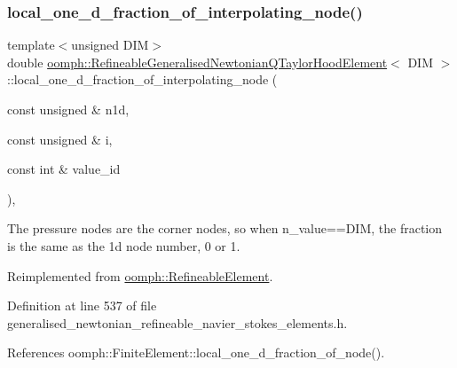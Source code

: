 \subsubsection{\texorpdfstring{local\+\_\+one\+\_\+d\+\_\+fraction\+\_\+of\+\_\+interpolating\+\_\+node()}{local\_one\_d\_fraction\_of\_interpolating\_node()}}
{\footnotesize\ttfamily template$<$unsigned D\+IM$>$ \\
double \hyperlink{classoomph_1_1RefineableGeneralisedNewtonianQTaylorHoodElement}{oomph\+::\+Refineable\+Generalised\+Newtonian\+Q\+Taylor\+Hood\+Element}$<$ D\+IM $>$\+::local\+\_\+one\+\_\+d\+\_\+fraction\+\_\+of\+\_\+interpolating\+\_\+node (\begin{DoxyParamCaption}\item[{const unsigned \&}]{n1d,  }\item[{const unsigned \&}]{i,  }\item[{const int \&}]{value\+\_\+id }\end{DoxyParamCaption})\hspace{0.3cm}{\ttfamily [inline]}, {\ttfamily [virtual]}}



The pressure nodes are the corner nodes, so when n\+\_\+value==D\+IM, the fraction is the same as the 1d node number, 0 or 1. 



Reimplemented from \hyperlink{classoomph_1_1RefineableElement_ac4e4ae5374154855ae9b072c6269f76e}{oomph\+::\+Refineable\+Element}.



Definition at line 537 of file generalised\+\_\+newtonian\+\_\+refineable\+\_\+navier\+\_\+stokes\+\_\+elements.\+h.



References oomph\+::\+Finite\+Element\+::local\+\_\+one\+\_\+d\+\_\+fraction\+\_\+of\+\_\+node().

\mbox{\label{classoomph_1_1RefineableGeneralisedNewtonianQTaylorHoodElement_a010adb919ba9b8850e5f586467777052}} 
